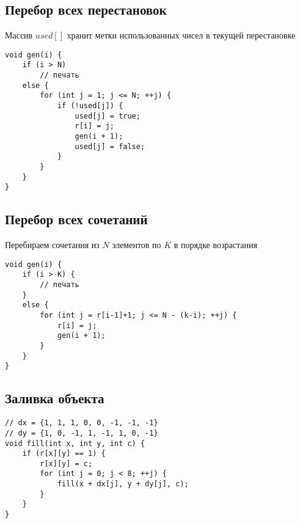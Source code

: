 \documentclass{article}
\begin{document}
\subsection{Перебор всех перестановок}

Массив $used[]$ хранит метки использованных чисел в текущей перестановке

\begin{lstlisting}
void gen(i) {
    if (i > N)
        // печать
    else {
        for (int j = 1; j <= N; ++j) {
            if (!used[j]) {
                used[j] = true;
                r[i] = j;
                gen(i + 1);
                used[j] = false;
            }
        }
    }
}
\end{lstlisting}

\subsection{Перебор всех сочетаний}

Перебираем сочетания из $N$ элементов по $K$ в порядке возрастания

\begin{lstlisting}
void gen(i) {
    if (i > K) {
        // печать
    }
    else {
        for (int j = r[i-1]+1; j <= N - (k-i); ++j) {
            r[i] = j;
            gen(i + 1);
        }
    }
}
\end{lstlisting}

\subsection{Заливка объекта}

\begin{lstlisting}
// dx = {1, 1, 1, 0, 0, -1, -1, -1}
// dy = {1, 0, -1, 1, -1, 1, 0, -1}
void fill(int x, int y, int c) {
    if (r[x][y] == 1) {
        r[x][y] = c;
        for (int j = 0; j < 8; ++j) {
            fill(x + dx[j], y + dy[j], c);
        }
    }
}
\end{lstlisting}
\end{document}
